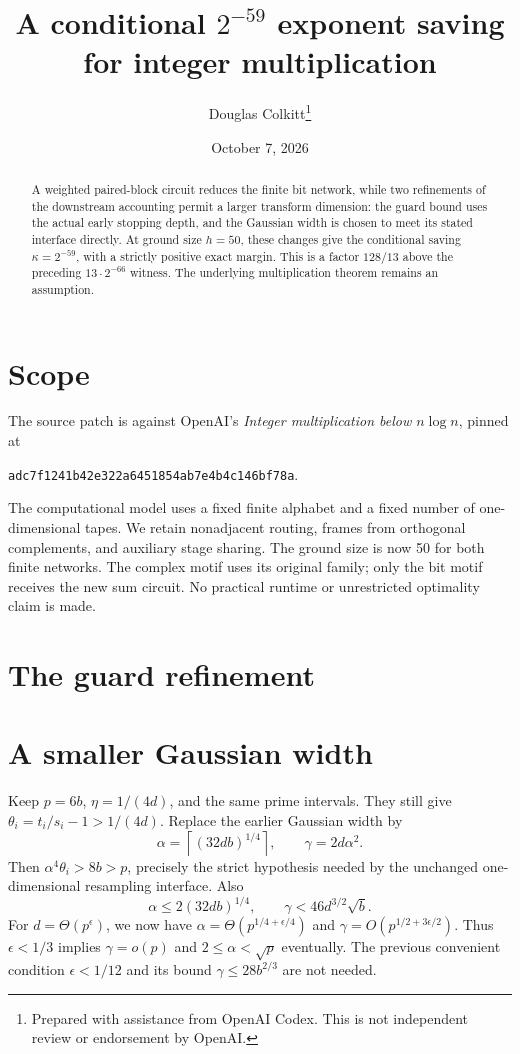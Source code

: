 \documentclass[11pt]{article}
\title{A conditional $2^{-59}$ exponent saving for integer multiplication}
\author{Douglas Colkitt\thanks{Prepared with assistance from OpenAI Codex.
This is not independent review or endorsement by OpenAI.}}
\date{October 7, 2026}
\begin{document}
\maketitle
\begin{abstract}
A weighted paired-block circuit reduces the finite bit network, while two
refinements of the downstream accounting permit a larger transform dimension:
the guard bound uses the actual early stopping depth, and the Gaussian width
is chosen to meet its stated interface directly. At ground size $h=50$, these
changes give the conditional saving $\kappa=2^{-59}$, with a strictly positive
exact margin. This is a factor $128/13$ above the preceding $13\cdot2^{-66}$
witness. The underlying multiplication theorem remains an assumption.
\end{abstract}
\section{Scope}
The source patch is against OpenAI's \emph{Integer multiplication below
$n\log n$}, pinned at
\begin{center}\texttt{adc7f1241b42e322a6451854ab7e4b4c146bf78a}.\end{center}
The computational model uses a fixed finite alphabet and a fixed number of
one-dimensional tapes. We retain nonadjacent routing, frames from orthogonal
complements, and auxiliary stage sharing. The ground size is
now 50 for both finite networks. The complex motif uses its original family;
only the bit motif receives the new sum circuit. No practical runtime or
unrestricted optimality claim is made.

\section{The guard refinement}

\section{A smaller Gaussian width}
Keep $p=6b$, $\eta=1/(4d)$, and the same prime intervals. They still give
$\theta_i=t_i/s_i-1>1/(4d)$. Replace the earlier Gaussian width by
\[
 \alpha=\left\lceil(32db)^{1/4}\right\rceil,\qquad
 \gamma=2d\alpha^2.
\]
Then $\alpha^4\theta_i>8b>p$, precisely the strict hypothesis needed by
the unchanged one-dimensional resampling interface. Also
\[
 \alpha\le2(32db)^{1/4},\qquad
 \gamma<46d^{3/2}\sqrt b.
\]
For $d=\Theta(p^\epsilon)$, we now have
$\alpha=\Theta(p^{1/4+\epsilon/4})$ and
$\gamma=O(p^{1/2+3\epsilon/2})$.
Thus $\epsilon<1/3$ implies $\gamma=o(p)$ and
$2\le\alpha<\sqrt p$ eventually. The previous convenient condition
$\epsilon<1/12$ and its bound $\gamma\le28b^{2/3}$ are not needed.
\end{document}
